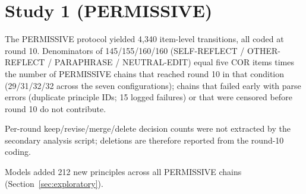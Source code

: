 \section{Study 1 (PERMISSIVE)}\label{app:study1}
The PERMISSIVE protocol yielded 4,340 item-level transitions, all coded at round 10.
Denominators of 145/155/160/160 (SELF-REFLECT / OTHER-REFLECT / PARAPHRASE / NEUTRAL-EDIT) equal five COR items times the number of PERMISSIVE chains that reached round 10 in that condition (29/31/32/32 across the seven configurations); chains that failed early with parse errors (duplicate principle IDs; 15 logged failures) or that were censored before round 10 do not contribute.



Per-round keep/revise/merge/delete decision counts were not extracted by the secondary analysis script; deletions are therefore reported from the round-10 coding.

Models added 212 new principles across all PERMISSIVE chains (Section~\ref{sec:exploratory}).
